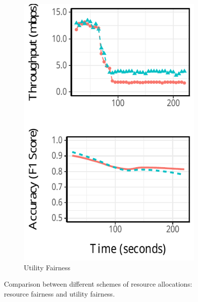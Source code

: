 \begin{figure}
\begin{subfigure}[t]{0.49\columnwidth}
    \centering
    \includegraphics[width=\textwidth]{figures/multitask-eq-acc.pdf}
    \caption{Utility Fairness}
    \label{fig:eq-acc}
  \end{subfigure}
  \caption{Comparison between different schemes of resource allocations:
    resource fairness and utility fairness.}
  \label{fig:multitask}
\end{figure}

\newpage

